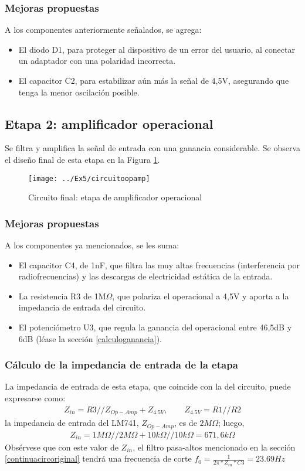 \subsubsection{Mejoras propuestas}
A los componentes anteriormente señalados, se agrega:
\begin{itemize}
    \item El diodo D1, para proteger al dispositivo de un error del usuario, al conectar un adaptador con una polaridad incorrecta.
    \item El capacitor C2, para estabilizar aún más la señal de 4,5V, asegurando que tenga la menor oscilación posible.
    \end{itemize}
\subsection{Etapa 2: amplificador operacional}
Se filtra y amplifica la señal de entrada con una ganancia considerable. Se observa el diseño final de esta etapa en la Figura \ref{fig:circuitoopamp}.
\begin{figure}[h]
    \centering
    \texttt{[image: ../Ex5/circuitoopamp]}
    \caption{Circuito final: etapa de amplificador operacional}
    \label{fig:circuitoopamp}
\end{figure}
\subsubsection{Mejoras propuestas}
A los componentes ya mencionados, se les suma:
\begin{itemize}
    \item El capacitor C4, de 1nF, que filtra las muy altas frecuencias (interferencia por radiofrecuencias) y las descargas de electricidad estática de la entrada.
    \item La resistencia R3 de 1M$\Omega$, que polariza el operacional a 4,5V y aporta a la impedancia de entrada del circuito.
    \item El potenciómetro U3, que regula la ganancia del operacional entre 46,5dB y 6dB (léase la sección \ref{calculoganancia}).
\end{itemize}
\subsubsection{Cálculo de la impedancia de entrada de la etapa} \label{calculoimpentrada}
La impedancia de entrada de esta etapa, que coincide con la del circuito, puede expresarse como:
\begin{align}
    Z_{in}=R3//Z_{Op-Amp}+Z_{4.5V},
    \qquad
    Z_{4.5V}=R1//R2
\end{align}
la impedancia de entrada del LM741, $Z_{Op-Amp}$, es de $2M\Omega$; luego,
\begin{align}
    Z_{in}=1M\Omega//2M\Omega+10k\Omega//10k\Omega=671,6k\Omega
\end{align}
Obsérvese que con este valor de $Z_{in}$, el filtro pasa-altos mencionado en la sección \ref{continuacircoriginal} tendrá una frecuencia de corte $f_{0}=\frac{1}{2\pi*Z_{in}*C3}=23.69Hz$
